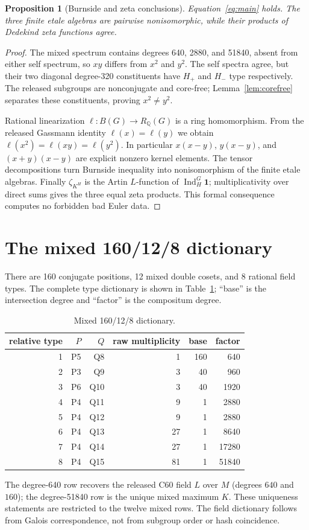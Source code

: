 \documentclass[11pt]{article}
\newtheorem{proposition}[theorem]{Proposition}
\newcommand{\Q}{\mathbb Q}
\begin{document}
\begin{proposition}[Burnside and zeta conclusions]\label{prop:burnside}
Equation~\eqref{eq:main} holds.  The three finite etale algebras are pairwise nonisomorphic,
while their products of Dedekind zeta functions agree.
\end{proposition}
\begin{proof}
The mixed spectrum contains degrees 640, 2880, and 51840, absent from either self spectrum,
so $xy$ differs from $x^2$ and $y^2$.  The self spectra agree, but their two diagonal
degree-320 constituents have $H_+$ and $H_-$ type respectively.  The released subgroups are
nonconjugate and core-free; Lemma~\ref{lem:corefree} separates these constituents, proving
$x^2\ne y^2$.

Rational linearization $\ell:B(G)\to R_\Q(G)$ is a ring homomorphism.  From the released
Gassmann identity $\ell(x)=\ell(y)$ we obtain
$\ell(x^2)=\ell(xy)=\ell(y^2)$.  In particular $x(x-y)$, $y(x-y)$, and
$(x+y)(x-y)$ are explicit nonzero kernel elements.  The tensor decompositions turn Burnside
inequality into nonisomorphism of the finite etale algebras.  Finally $\zeta_{K^H}$ is the Artin
$L$-function of $\operatorname{Ind}_H^G\mathbf1$; multiplicativity over direct sums gives the
three equal zeta products.  This formal consequence computes no forbidden bad Euler data.
\end{proof}

\section{The mixed 160/12/8 dictionary}
There are 160 conjugate positions, 12 mixed double cosets, and 8 rational field types.  The
complete type dictionary is shown in Table~\ref{tab:dictionary}; ``base'' is the intersection
degree and ``factor'' is the compositum degree.
\begin{table}[ht]
\centering\small
\caption{Mixed 160/12/8 dictionary.}\label{tab:dictionary}
\begin{tabular}{@{}rrrrrr@{}}
\toprule relative type&$P$&$Q$&raw multiplicity&base&factor\\\midrule
1&P5&Q8&1&160&640\\2&P3&Q9&3&40&960\\3&P6&Q10&3&40&1920\\
4&P4&Q11&9&1&2880\\5&P4&Q12&9&1&2880\\6&P4&Q13&27&1&8640\\
7&P4&Q14&27&1&17280\\8&P4&Q15&81&1&51840\\\bottomrule
\end{tabular}
\end{table}
The degree-640 row recovers the released C60 field $L$ over $M$ (degrees $640$ and $160$);
the degree-51840 row is the unique mixed maximum $K$.  These uniqueness statements are
restricted to the twelve mixed rows.  The field dictionary follows from Galois correspondence,
not from subgroup order or hash coincidence.
\end{document}

